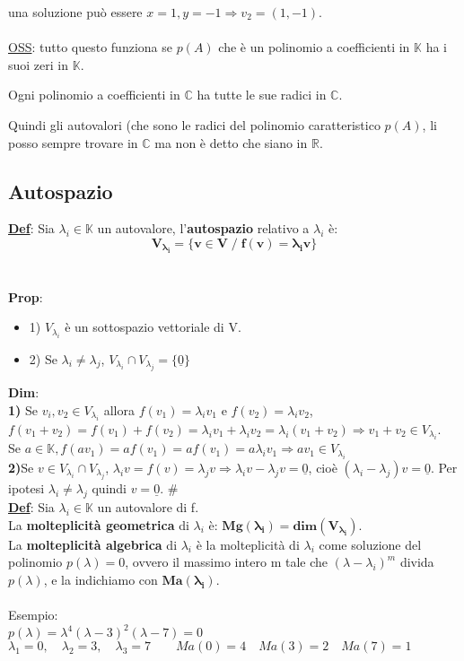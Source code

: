 \documentclass[12pt]{article}
\begin{document}
una soluzione può essere $x=1, y=-1 \Longrightarrow v_2 = (1,-1)$.\\\\
\underline{OSS}: tutto questo funziona se $p(A)$ che è un polinomio a coefficienti in $\mathbb{K}$ ha i suoi zeri in $\mathbb{K}$.
\begin{theorem}
Ogni polinomio a coefficienti in $\mathbb{C}$ ha tutte le sue radici in $\mathbb{C}.$    
\end{theorem}
Quindi gli autovalori (che sono le radici del polinomio caratteristico $p(A)$, li posso sempre trovare in $\mathbb{C}$ ma non è detto che siano in $\mathbb{R}$.

\subsection{Autospazio}
 \textbf{\underline{Def}}: Sia $\lambda_i \in \mathbb{K}$ un autovalore, l'\textbf{autospazio} relativo a $\lambda_i$ è:$$ \boldsymbol{V_{\lambda_i} = \{v \in V \;/\; f(v) = \lambda_iv\}}$$
\\\\
 \textbf{Prop}:
 \begin{itemize}
     \item 1) $V_{\lambda_i}$ è un sottospazio vettoriale di V.
     \item 2) Se $\lambda_i \neq \lambda_j$, $V_{\lambda_i} \cap V_{\lambda_j} = \{\underline{0}\} $
 \end{itemize}
\textbf{Dim}:\\
\textbf{1)} Se $v_i, v_2 \in V_{\lambda_i}$ allora $f(v_1) = \lambda_iv_1$ e $f(v_2) = \lambda_iv_2$, $f(v_1+v_2) = f(v_1)+f(v_2) = \lambda_iv_1 +\lambda_iv_2 = \lambda_i(v_1+v_2) \Rightarrow v_1 + v_2 \in V_{\lambda_i}$.\\ Se $a\in \mathbb{K}, f(av_1) = af(v_1) = af(v_1) = a\lambda_iv_1 \Rightarrow av_1 \in V_{\lambda_i}$\\
\textbf{2)}Se $v \in V_{\lambda_i} \cap V_{\lambda_j}$, $\lambda_iv = f(v) = \lambda_jv \Rightarrow \lambda_iv - \lambda_jv = \underline{0}$, cioè $(\lambda_i-\lambda_j)v = \underline{0}$. Per ipotesi $\lambda_i \neq \lambda_j$ quindi $v = \underline{0}$. \#\\

\noindent \textbf{\underline{Def}}: Sia $\lambda_i \in \mathbb{K}$ un autovalore di f. 
\\La \textbf{molteplicità geometrica} di $\lambda_i$ è: $\boldsymbol{Mg(\lambda_i) = dim(V_{\lambda_i})}$.
\\La \textbf{molteplicità algebrica} di $\lambda_i$ è la molteplicità di $\lambda_i$ come soluzione del polinomio $p(\lambda) = 0$, ovvero il massimo intero m tale che $(\lambda-\lambda_i)^m$ divida $p(\lambda)$, e la indichiamo con $\boldsymbol{Ma(\lambda_i)}$.\\\\
Esempio:\\
$p(\lambda) = \lambda^4(\lambda-3)^2(\lambda-7) = 0$\\
$\lambda_1 = 0, \quad \lambda_2 = 3, \quad \lambda_3 = 7 \quad \quad Ma(0) = 4\quad Ma(3) = 2\quad Ma(7) = 1$\\
\end{document}
